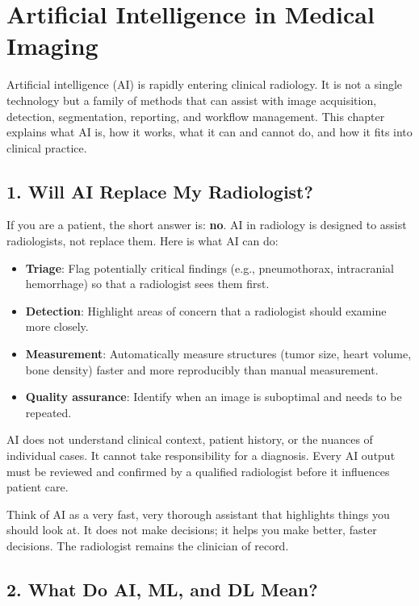 \chapter{Artificial Intelligence in Medical Imaging}

\label{ch:ch10_ai_intro}

Artificial intelligence (AI) is rapidly entering clinical radiology. It is not a single technology but a family of methods that can assist with image acquisition, detection, segmentation, reporting, and workflow management. This chapter explains what AI is, how it works, what it can and cannot do, and how it fits into clinical practice.


\section*{1. Will AI Replace My Radiologist?}
If you are a patient, the short answer is: \textbf{no}. AI in radiology is designed to assist radiologists, not replace them. Here is what AI can do:
\begin{itemize}
    \item \textbf{Triage}: Flag potentially critical findings (e.g., pneumothorax, intracranial hemorrhage) so that a radiologist sees them first.
    \item \textbf{Detection}: Highlight areas of concern that a radiologist should examine more closely.
    \item \textbf{Measurement}: Automatically measure structures (tumor size, heart volume, bone density) faster and more reproducibly than manual measurement.
    \item \textbf{Quality assurance}: Identify when an image is suboptimal and needs to be repeated.
\end{itemize}

AI does not understand clinical context, patient history, or the nuances of individual cases. It cannot take responsibility for a diagnosis. Every AI output must be reviewed and confirmed by a qualified radiologist before it influences patient care.

\begin{pearlbox}
Think of AI as a very fast, very thorough assistant that highlights things you should look at. It does not make decisions; it helps you make better, faster decisions. The radiologist remains the clinician of record.
\end{pearlbox}


\section*{2. What Do AI, ML, and DL Mean?}

